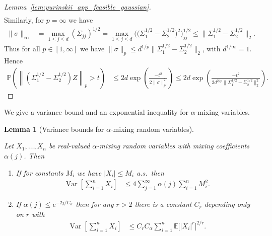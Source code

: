 \documentclass[11pt,lof]{puthesis}
\renewcommand{\P}{\ensuremath{\mathbb{P}}}
\newcommand{\E}{\ensuremath{\mathbb{E}}}
\DeclareMathOperator{\Var}{Var}
\theoremstyle{break}
\newtheorem{lemma}{Lemma}[section]
\theoremstyle{proof}
\newtheorem{proof}{Proof}
\begin{document}
\begin{proof}[Lemma~\ref{lem:yurinskii_app_feasible_gaussian}]
\begin{align*}
  \end{align*}
  Similarly, for $p = \infty$ we have
  \begin{align*}
    \|\sigma\|_\infty
    &=
    \max_{1 \leq j \leq d}
    (\Sigma_{j j})^{1/2}
    =
    \max_{1 \leq j \leq d}
    \Big(\big(\Sigma_1^{1/2} - \Sigma_2^{1/2}\big)^2\Big)_{j j}^{1/2}
    \leq
    \big\|\Sigma_1^{1/2} - \Sigma_2^{1/2}\big\|_2.
  \end{align*}
  Thus for all $p \in [1, \infty]$ we have
  $\|\sigma\|_p \leq
  d^{1/p} \big\|\Sigma_1^{1/2} - \Sigma_2^{1/2}\big\|_2$,
  with $d^{1/\infty} = 1$. Hence
  \begin{align*}
    \P\left(
      \left\|
      \left(\Sigma_1^{1/2} - \Sigma_2^{1/2}\right) Z
      \right\|_p
      > t
    \right)
    &\leq
    2 d \exp \left( \frac{-t^2}{2 \|\sigma\|_p^2} \right)
    \leq
    2 d \exp \left(
      \frac{-t^2}
      {2 d^{2/p} \big\|\Sigma_1^{1/2} - \Sigma_2^{1/2}\big\|_2^2}
    \right).
  \end{align*}
\end{proof}

We give a variance bound and an exponential inequality for $\alpha$-mixing
variables.

\begin{lemma}[Variance bounds for
  \texorpdfstring{$\alpha$}{alpha}-mixing random variables]
  \label{lem:yurinskii_app_variance_mixing}

  Let $X_1, \ldots, X_n$ be
  real-valued $\alpha$-mixing random
  variables with mixing coefficients $\alpha(j)$.
  Then
  \begin{enumerate}[label=(\roman*)]

    \item
      \label{it:yurinskii_app_variance_mixing_bounded}
      If for constants $M_i$ we have
      $|X_i| \leq M_i$ a.s.\ then
      \begin{align*}
        \Var\left[
          \sum_{i=1}^n X_i
        \right]
        &\leq
        4 \sum_{j=1}^\infty \alpha(j)
        \sum_{i=1}^n M_i^2.
      \end{align*}

    \item
      \label{it:yurinskii_app_variance_mixing_exponential}
      If $\alpha(j) \leq e^{-2j / C_\alpha}$ then
      for any $r>2$ there is a constant
      $C_r$ depending only on $r$ with
      \begin{align*}
        \Var\left[
          \sum_{i=1}^n X_i
        \right]
        &\leq
        C_r C_\alpha
        \sum_{i=1}^n
        \E\big[|X_i|^r\big]^{2/r}.
      \end{align*}
  \end{enumerate}
\end{lemma}
\end{document}
